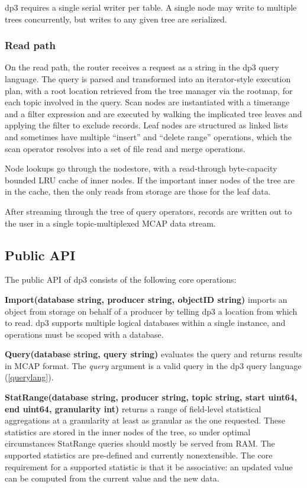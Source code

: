 \documentclass[9pt,twocolumn]{article}
\newcommand{\q}[1]{``#1''}
\begin{document}
    dp3 requires a single serial writer per table. A single node may write to
    multiple trees concurrently, but writes to any given tree are serialized.

    \subsubsection{Read path}
    On the read path, the router receives a request as a string in the dp3
    query language. The query is parsed and transformed into an iterator-style
    execution plan, with a root location retrieved from the tree manager via
    the rootmap, for each topic involved in the query. Scan nodes are
    instantiated with a timerange and a filter expression and are executed by
    walking the implicated tree leaves and applying the filter to exclude
    records. Leaf nodes are structured as linked lists and sometimes have
    multiple \q{insert} and \q{delete range} operations, which the scan
    operator resolves into a set of file read and merge operations.

    Node lookups go through the nodestore, with a read-through byte-capacity
    bounded LRU cache of inner nodes. If the important inner nodes of the tree are
    in the cache, then the only reads from storage are those for the leaf data.

    After streaming through the tree of query operators, records are written out
    to the user in a single topic-multiplexed MCAP data stream.

    \subsection{Public API} \label{api}
    The public API of dp3 consists of the following core operations:

    \textbf{Import(database string, producer string, objectID string)} imports
    an object from storage on behalf of a producer by telling dp3 a location
    from which to read. dp3 supports multiple logical databases within a single
    instance, and operations must be scoped with a database.

    \textbf{Query(database string, query string)} evaluates the query and
    returns results in MCAP format. The \textit{query} argument is a valid
    query in the dp3 query language (\ref{querylang}).

    \textbf{StatRange(database string, producer string, topic string, start
    uint64, end uint64, granularity int)} returns a range of field-level
    statistical aggregations at a granularity at least as granular as the one
    requested. These statistics are stored in the inner nodes of the tree, so
    under optimal circumstances StatRange queries should mostly be served from
    RAM. The supported statistics are pre-defined and currently nonextensible.
    The core requirement for a supported statistic is that it be associative:
    an updated value can be computed from the current value and the new data.
\end{document}
